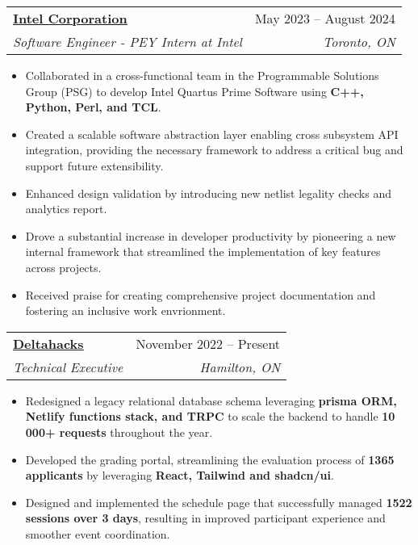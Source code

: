 \documentclass[letterpaper,11pt]{article}
\makeatletter
\newcommand{\resumeItem}[1]{
  \item\small{
    {#1 \vspace{-2pt}}
  }
}
\newcommand{\resumeSubheading}[4]{
  \vspace{-2pt}\item
    \begin{tabular*}{0.97\textwidth}[t]{l@{\extracolsep{\fill}}r}
      \textbf{#1} & #2 \\
      \textit{\small#3} & \textit{\small #4} \\
    \end{tabular*}\vspace{-7pt}
}
\newcommand{\resumeItemListStart}{\begin{itemize}}
\newcommand{\resumeItemListEnd}{\end{itemize}\vspace{-5pt}}
\makeatother
\begin{document}
\resumeSubheading
{\href{https://www.intel.com/content/www/us/en/homepage.html}{\underline{Intel Corporation}}}{May 2023 -- August 2024}
{Software Engineer - PEY Intern at Intel}{Toronto, ON}
\resumeItemListStart
\resumeItem{Collaborated in a cross-functional team in the Programmable Solutions Group (PSG) to develop Intel Quartus Prime Software using \textbf{C++, Python, Perl, and TCL}.}
\resumeItem{Created a scalable software abstraction layer enabling cross subsystem API integration, providing the necessary framework to address a critical bug and support future extensibility.}
\resumeItem{Enhanced design validation by introducing new netlist legality checks and analytics report.}
\resumeItem{Drove a substantial increase in developer productivity by pioneering a new internal framework that streamlined the implementation of key features across projects.}
\resumeItem{Received praise for creating comprehensive project documentation and fostering an inclusive work envrionment.}
\resumeItemListEnd

\resumeSubheading
{\href{https://deltahacks.com/}{\underline{Deltahacks}}}{November 2022 -- Present}
{Technical Executive}{Hamilton, ON}
\resumeItemListStart
\resumeItem{Redesigned a legacy relational database schema leveraging \textbf{prisma ORM, Netlify functions stack, and TRPC} to scale the backend to handle \textbf{10 000+ requests} throughout the year.}
\resumeItem{Developed the grading portal, streamlining the evaluation process of \textbf{1365 applicants} by leveraging \textbf{React, Tailwind and shadcn/ui}.}
\resumeItem{Designed and implemented the schedule page that successfully managed \textbf{1522 sessions over 3 days}, resulting in improved participant experience and smoother event coordination.}
\resumeItemListEnd
\end{document}
